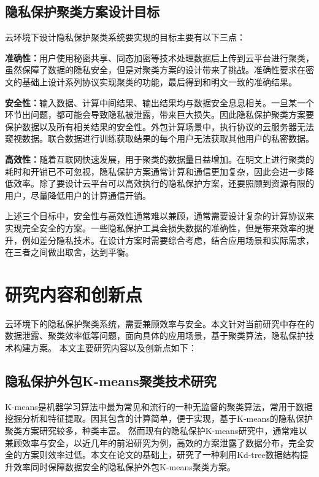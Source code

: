 \subsection{隐私保护聚类方案设计目标}
云环境下设计隐私保护聚类系统要实现的目标主要有以下三点：
\begin{compactitem}
	\item \textbf{准确性：}用户使用秘密共享、同态加密等技术处理数据后上传到云平台进行聚类，虽然保障了数据的隐私安全，但是对聚类方案的设计带来了挑战。准确性要求在密文的基础上设计系列协议实现聚类的功能，最后得到和明文一致的准确结果。
	\item \textbf{安全性：}输入数据、计算中间结果、输出结果均与数据安全息息相关。一旦某一个环节出问题，都可能会导致隐私被泄露，带来巨大损失。因此隐私保护聚类方案要保护数据以及所有相关结果的安全性。外包计算场景中，执行协议的云服务器无法窥视数据。联合数据进行训练获取结果的每个用户无法获取其他用户的私密数据。
	\item \textbf{高效性：}随着互联网快速发展，用于聚类的数据量日益增加。在明文上进行聚类的耗时和开销已不可忽视，隐私保护方案通常计算和通信更加复杂，因此会进一步降低效率。除了要设计云平台可以高效执行的隐私保护方案，还要照顾到资源有限的用户，尽量降低用户的计算通信开销。
\end{compactitem}

上述三个目标中，安全性与高效性通常难以兼顾，通常需要设计复杂的计算协议来实现完全安全的方案。一些隐私保护工具会损失数据的准确性，但是带来效率的提升，例如差分隐私技术。在设计方案时需要综合考虑，结合应用场景和实际需求，在三者之间做出取舍，达到平衡。
\section{研究内容和创新点}
云环境下的隐私保护聚类系统，需要兼顾效率与安全。本文针对当前研究中存在的数据泄露、聚类效率低等问题，面向具体的应用场景，基于聚类算法，隐私保护技术构建方案。
本文主要研究内容以及创新点如下：
\subsection{隐私保护外包K-means聚类技术研究}
K-means是机器学习算法中最为常见和流行的一种无监督的聚类算法，常用于数据挖掘分析和特征提取。因其包含的计算简单，便于实现，基于K-means的隐私保护聚类方案研究较多，种类丰富。
然而现有的隐私保护K-means研究中，通常难以兼顾效率与安全，以近几年的前沿研究为例，高效的方案泄露了数据分布\cite{wu2020secure}，完全安全的方案则效率过低\cite{jaschke2019unsupervised}。本文在论文\cite{kanungo2002efficient}的基础上，研究了一种利用Kd-tree数据结构提升效率同时保障数据安全的隐私保护外包K-means聚类方案。

